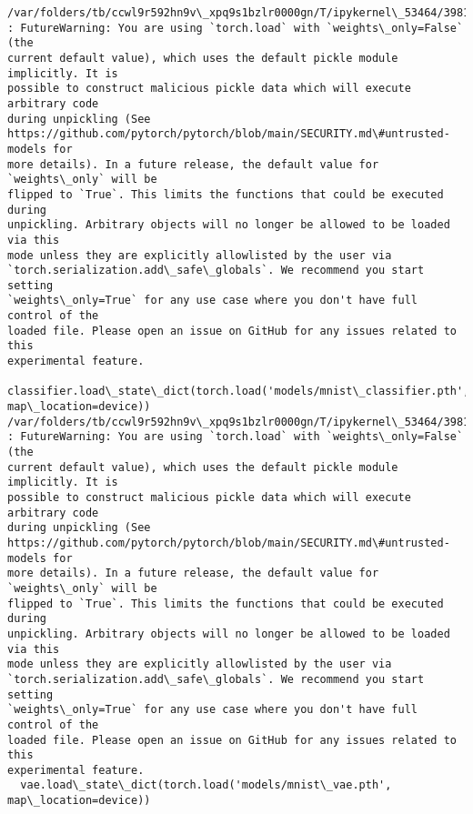 \documentclass[11pt]{article}
\begin{document}
    \begin{Verbatim}[commandchars=\\\{\}]
/var/folders/tb/ccwl9r592hn9v\_xpq9s1bzlr0000gn/T/ipykernel\_53464/3981658417.py:7
: FutureWarning: You are using `torch.load` with `weights\_only=False` (the
current default value), which uses the default pickle module implicitly. It is
possible to construct malicious pickle data which will execute arbitrary code
during unpickling (See
https://github.com/pytorch/pytorch/blob/main/SECURITY.md\#untrusted-models for
more details). In a future release, the default value for `weights\_only` will be
flipped to `True`. This limits the functions that could be executed during
unpickling. Arbitrary objects will no longer be allowed to be loaded via this
mode unless they are explicitly allowlisted by the user via
`torch.serialization.add\_safe\_globals`. We recommend you start setting
`weights\_only=True` for any use case where you don't have full control of the
loaded file. Please open an issue on GitHub for any issues related to this
experimental feature.
  classifier.load\_state\_dict(torch.load('models/mnist\_classifier.pth',
map\_location=device))
/var/folders/tb/ccwl9r592hn9v\_xpq9s1bzlr0000gn/T/ipykernel\_53464/3981658417.py:8
: FutureWarning: You are using `torch.load` with `weights\_only=False` (the
current default value), which uses the default pickle module implicitly. It is
possible to construct malicious pickle data which will execute arbitrary code
during unpickling (See
https://github.com/pytorch/pytorch/blob/main/SECURITY.md\#untrusted-models for
more details). In a future release, the default value for `weights\_only` will be
flipped to `True`. This limits the functions that could be executed during
unpickling. Arbitrary objects will no longer be allowed to be loaded via this
mode unless they are explicitly allowlisted by the user via
`torch.serialization.add\_safe\_globals`. We recommend you start setting
`weights\_only=True` for any use case where you don't have full control of the
loaded file. Please open an issue on GitHub for any issues related to this
experimental feature.
  vae.load\_state\_dict(torch.load('models/mnist\_vae.pth', map\_location=device))
    \end{Verbatim}
\end{document}
